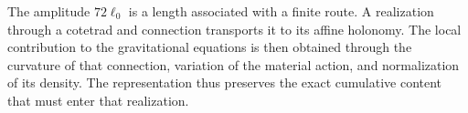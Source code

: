 The amplitude \(72\ell_0\) is a length associated with a finite route.
A realization through a cotetrad and connection transports it to its
affine holonomy. The local contribution to the gravitational equations
is then obtained through the curvature of that connection,
variation of the material action, and normalization of its density.
The representation thus preserves the exact cumulative content
that must enter that realization.
